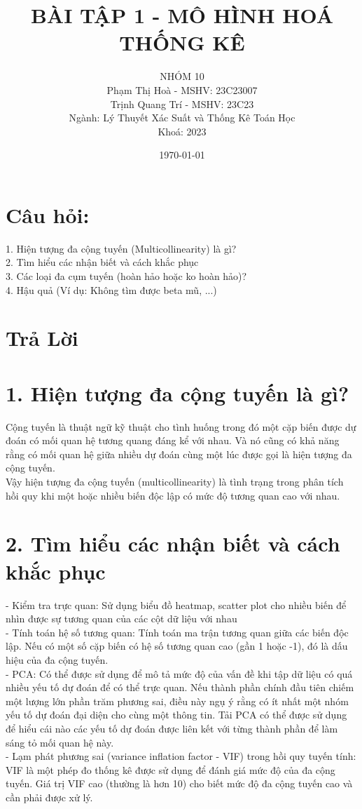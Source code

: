 \documentclass[a4paper,12pt]{article}
\title {BÀI TẬP 1 - MÔ HÌNH HOÁ THỐNG KÊ}
\author{NHÓM 10\\
Phạm Thị Hoà - MSHV: 23C23007\\
Trịnh Quang Trí - MSHV: 23C23\\
Ngành: Lý Thuyết Xác Suất và Thống Kê Toán Học\\
Khoá: 2023
}
\date{\today}
\begin{document}
\maketitle
\section *{Câu hỏi:}
1. Hiện tượng đa cộng tuyến (Multicollinearity) là gì?\\
2. Tìm hiểu các nhận biết và cách khắc phục\\
3. Các loại đa cụm tuyến (hoàn hảo hoặc ko hoàn hảo)?\\
4. Hậu quả (Ví dụ: Không tìm được beta mũ, ...)\\
\section* {Trả Lời}

\section * {1. Hiện tượng đa cộng tuyến là gì?}

Cộng tuyến là thuật ngữ kỹ thuật cho tình huống trong đó một cặp biến được dự đoán có mối quan hệ tương quang đáng kể với nhau. Và nó cũng có khả năng rằng có mối quan hệ giữa nhiều dự đoán cùng một lúc được gọi là hiện tượng đa cộng tuyến.\\
Vậy hiện tượng đa cộng tuyến (multicollinearity) là tình trạng trong phân tích hồi quy khi một hoặc nhiều biến độc lập có mức độ tương quan cao với nhau.

\section*  {2. Tìm hiểu các nhận biết và cách khắc phục}
- Kiểm tra trực quan: Sử dụng biểu đồ heatmap, scatter plot cho nhiều biến để nhìn được sự tương quan của các cột dữ liệu với nhau\\
- Tính toán hệ số tương quan: Tính toán ma trận tương quan giữa các biến độc lập. Nếu có một số cặp biến có hệ số tương quan cao (gần 1 hoặc -1), đó là dấu hiệu của đa cộng tuyến.\\
- PCA: Có thể được sử dụng để mô tả mức độ của vấn đề khi tập dữ liệu có quá nhiều yếu tố dự đoán để có thể trực quan. Nếu thành phần chính đầu tiên chiếm một lượng lớn phần trăm phương sai, điều này ngụ ý rằng có ít nhất một nhóm yếu tố dự đoán đại diện cho cùng một thông tin. Tải PCA có thể được sử dụng để hiểu cái nào
các yếu tố dự đoán được liên kết với từng thành phần để làm sáng tỏ mối quan hệ này.\\
- Lạm phát phương sai (variance inflation factor - VIF) trong hồi quy tuyến tính: VIF là một phép đo thống kê được sử dụng để đánh giá mức độ của đa cộng tuyến. Giá trị VIF cao (thường là hơn 10) cho biết mức độ đa cộng tuyến cao và cần phải được xử lý.\\
\end{document}
